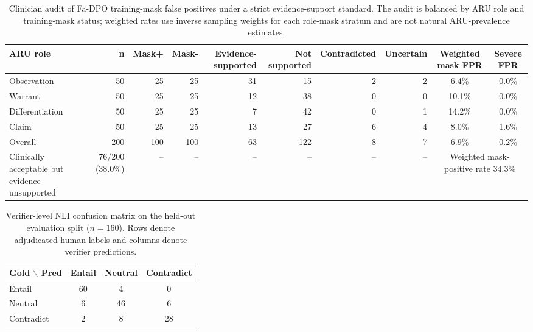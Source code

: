 \documentclass[a4paper,fleqn,doubleblind]{cas-sc}
\begin{document}
\begin{table}[htbp]
    \centering
    \begingroup\color{blue}
    \caption{Clinician audit of Fa-DPO training-mask false positives under a strict evidence-support standard. The audit is balanced by ARU role and training-mask status; weighted rates use inverse sampling weights for each role-mask stratum and are not natural ARU-prevalence estimates.}
    \label{tab:training_mask_fp_audit}
    \begin{adjustbox}{max width=\textwidth}
    \begin{tabular}{lrrrrrrrcc}
        \toprule
        \textbf{ARU role} & \textbf{n} & \textbf{Mask+} & \textbf{Mask-} & \textbf{Evidence-supported} & \textbf{Not supported} & \textbf{Contradicted} & \textbf{Uncertain} & \textbf{Weighted mask FPR} & \textbf{Severe FPR} \\
        \midrule
        Observation & 50 & 25 & 25 & 31 & 15 & 2 & 2 & 6.4\% & 0.0\% \\
        Warrant & 50 & 25 & 25 & 12 & 38 & 0 & 0 & 10.1\% & 0.0\% \\
        Differentiation & 50 & 25 & 25 & 7 & 42 & 0 & 1 & 14.2\% & 0.0\% \\
        Claim & 50 & 25 & 25 & 13 & 27 & 6 & 4 & 8.0\% & 1.6\% \\
        \midrule
        Overall & 200 & 100 & 100 & 63 & 122 & 8 & 7 & 6.9\% & 0.2\% \\
        Clinically acceptable but evidence-unsupported & 76/200 (38.0\%) & -- & -- & -- & -- & -- & -- & \multicolumn{2}{c}{Weighted mask-positive rate 34.3\%} \\
        \bottomrule
    \end{tabular}
    \end{adjustbox}
    \endgroup
\end{table}

\begin{table}[!b]
    \centering
    \caption{Verifier-level NLI confusion matrix on the held-out evaluation split ($n=160$). Rows denote adjudicated human labels and columns denote verifier predictions.}
    \label{tab:nli_confusion_template}
    \begin{tabular}{lccc}
        \toprule
        \textbf{Gold $\backslash$ Pred} & \textbf{Entail} & \textbf{Neutral} & \textbf{Contradict} \\
        \midrule
        Entail & 60 & 4 & 0 \\
        Neutral & 6 & 46 & 6 \\
        Contradict & 2 & 8 & 28 \\
        \bottomrule
    \end{tabular}
\end{table}

\FloatBarrier

\end{document}
